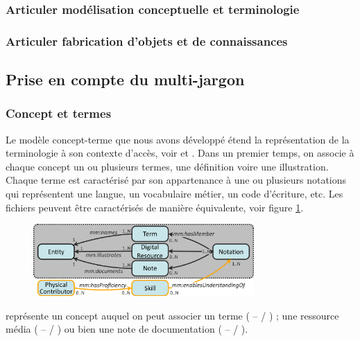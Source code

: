\subsubsection{Articuler modélisation conceptuelle et terminologie}%


\subsubsection{Articuler fabrication d'objets et de connaissances}%




\subsection{Prise en compte du multi-jargon}\label{}

\subsubsection{Concept et termes}\label{sec:onter}
Le modèle concept-terme que nous avons développé étend la représentation de la terminologie à son contexte d'accès, voir \cite{Diemert2010} et \cite{Diemert2011a}. Dans un premier temps, on associe à chaque concept un ou plusieurs termes, une définition voire une illustration. Chaque terme est caractérisé par son appartenance à une ou plusieurs notations qui représentent une langue, un vocabulaire métier, un code d'écriture, etc. Les fichiers peuvent être caractérisés de manière équivalente, voir figure \ref{img:mj-ct}.


\begin{figure}[ht!]
\centering
\includegraphics[width=0.75\textwidth]{./images/MOD-TermConcept-v5a.png}
\caption{}
\label{img:mj-ct}
\end{figure}


	 représente un concept auquel on peut associer
		un terme ( --  / ) ; une ressource média ( --  / ) ou bien une note de documentation ( --  / ).

